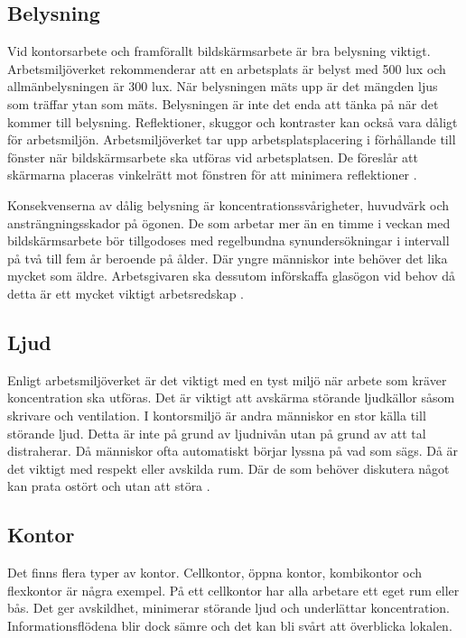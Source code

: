 \subsection{Belysning}
Vid kontorsarbete och framförallt bildskärmsarbete är bra belysning viktigt. Arbetsmiljöverket rekommenderar att en arbetsplats är belyst med 500 lux och allmänbelysningen är 300 lux. När belysningen mäts upp är det mängden ljus som träffar ytan som mäts. Belysningen är inte det enda att tänka på när det kommer till belysning. Reflektioner, skuggor och kontraster kan också vara dåligt för arbetsmiljön. Arbetsmiljöverket tar upp arbetsplatsplacering i förhållande till fönster när bildskärmsarbete ska utföras vid arbetsplatsen. De föreslår att skärmarna placeras vinkelrätt mot fönstren för att minimera reflektioner \cite{AVLjus}\cite{AVDator}.

Konsekvenserna av dålig belysning är koncentrationssvårigheter, huvudvärk och ansträngningsskador på ögonen. De som arbetar mer än en timme i veckan med bildskärmsarbete bör tillgodoses med regelbundna synundersökningar i intervall på två till fem år beroende på ålder. Där yngre människor inte behöver det lika mycket som äldre. Arbetsgivaren ska dessutom införskaffa glasögon vid behov då detta är ett mycket viktigt arbetsredskap \cite{AVLjus}.

\subsection{Ljud}
Enligt arbetsmiljöverket är det viktigt med en tyst miljö när arbete som kräver koncentration ska utföras. Det är viktigt att avskärma störande ljudkällor såsom skrivare och ventilation. I kontorsmiljö är andra människor en stor källa till störande ljud. Detta är inte på grund av ljudnivån utan på grund av att tal distraherar. Då människor ofta automatiskt börjar lyssna på vad som sägs. Då är det viktigt med respekt eller avskilda rum. Där de som behöver diskutera något kan prata ostört och utan att störa \cite{AVLjud}.

\subsection{Kontor}
Det finns flera typer av kontor. Cellkontor, öppna kontor, kombikontor och flexkontor är några exempel. På ett cellkontor har alla arbetare ett eget rum eller bås. Det ger avskildhet, minimerar störande ljud och underlättar koncentration. Informationsflödena blir dock sämre och det kan bli svårt att överblicka lokalen.

